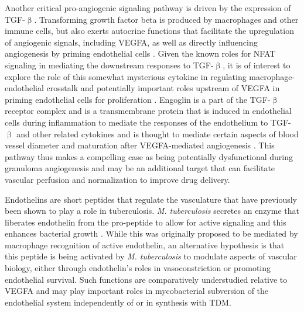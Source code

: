 Another critical pro\hyp{}angiogenic signaling pathway is driven by the expression of TGF\hyp{}$\upbeta$. Transforming growth factor beta is produced by macrophages and other immune cells, but also exerts autocrine functions that facilitate the upregulation of angiogenic signals, including VEGFA, as well as directly influencing angiogenesis by priming endothelial cells \citep{Jeon2007, Ferrari2009, Goumans2009}. Given the known roles for NFAT signaling in mediating the downstream responses to TGF\hyp{}$\upbeta$, it is of interest to explore the role of this somewhat mysterious cytokine in regulating macrophage\hyp{}endothelial crosstalk and potentially important roles upstream of VEGFA in priming endothelial cells for proliferation \citep{Cobbs2007}. Engoglin is a part of the TGF\hyp{}$\upbeta$ receptor complex and is a transmembrane protein that is induced in endothelial cells during inflammation to mediate the responses of the endothelium to TGF\hyp{}$\upbeta$ and other related cytokines and is thought to mediate certain aspects of blood vessel diameter and maturation after VEGFA\hyp{}mediated angiogenesis \citep{Liu2014, Sugden2017}. This pathway thus makes a compelling case as being potentially dysfunctional during granuloma angiogenesis and may be an additional target that can facilitate vascular perfusion and normalization to improve drug delivery. 

Endothelins are short peptides that regulate the vasculature that have previously been shown to play a role in tuberculosis. \textit{M. tuberculosis} secretes an enzyme that liberates endothelin from the pro\hyp{}peptide to allow for active signaling and this enhances bacterial growth \citep{Correa2014}. While this was originally proposed to be mediated by macrophage recognition of active endothelin, an alternative hypothesis is that this peptide is being activated by \textit{M. tuberculosis} to modulate aspects of vascular biology, either through endothelin's roles in vasoconstriction or promoting endothelial survival. Such functions are comparatively understudied relative to VEGFA and may play important roles in mycobacterial subversion of the endothelial system independently of or in synthesis with TDM.

